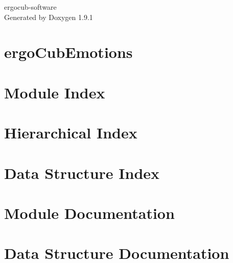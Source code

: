 \let\mypdfximage\pdfximage\def\pdfximage{\immediate\mypdfximage}\documentclass[twoside]{book}
\newcommand{\+}{\discretionary{\mbox{\scriptsize$\hookleftarrow$}}{}{}}
\newcommand{\clearemptydoublepage}{%
  \newpage{\pagestyle{empty}\cleardoublepage}%
}
\begin{document}
\raggedbottom

\begin{titlepage}
\vspace*{7cm}
\begin{center}%
{\Large ergocub-\/software }\\
\vspace*{1cm}
{\large Generated by Doxygen 1.9.1}\\
\end{center}
\end{titlepage}
\clearemptydoublepage
{}
\tableofcontents
\clearemptydoublepage
{}

\chapter{ergo\+Cub\+Emotions}
\label{md__home_runner_work_ergocub_software_ergocub_software_src_modules_ergoCubEmotions_README}

\chapter{Module Index}

\chapter{Hierarchical Index}

\chapter{Data Structure Index}

\chapter{Module Documentation}


\chapter{Data Structure Documentation}


\backmatter
\newpage
{}
\clearemptydoublepage
{}
\printindex
\end{document}
